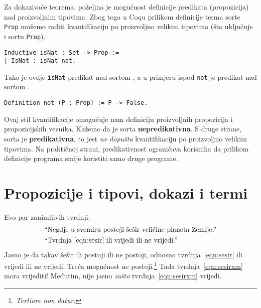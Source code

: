 Za dokazivače teorema, poželjna je mogućnost definicije predikata (propozicija) nad proizvoljnim tipovima.
Zbog toga u Coqu prilikom definicije terma sorte \texttt{Prop} možemo raditi kvantifikaciju po proizvoljno velikim tipovima
(što uključuje i sortu \texttt{Prop}).
\begin{verbatim}
Inductive isNat : Set -> Prop :=
| IsNat : isNat nat.
\end{verbatim}
\noindent Tako je ovdje \texttt{isNat} predikat nad sortom \coqset{}, a u primjeru ispod \texttt{not} je predikat nad sortom \coqprop{}.
\begin{verbatim}
Definition not (P : Prop) := P -> False.
\end{verbatim}
\noindent Ovaj stil kvantifikacije omogućuje nam definiciju proizvoljnih propozicija i propozicijskih veznika.
Kažemo da je sorta \coqprop{} \textbf{nepredikativna}.
S druge strane, sorta \coqset{} je \textbf{predikativna}, to jest \textit{ne dopušta} kvantifikaciju po proizvoljno velikim tipovima.
Na praktičnoj strani, predikativnost ograničava korisnika da prilikom definicije programa smije koristiti samo druge programe.


\section{Propozicije i tipovi, dokazi i termi}\label{sec:propozicije-i-tipovi}
Evo par zanimljivih tvrdnji:
\begin{align}
  & \textrm{``Negdje u svemiru postoji šešir veličine planeta Zemlje.''}\label{eqn:sesir}\\
  & \textrm{``Tvrdnja~\ref{eqn:sesir} ili vrijedi ili ne vrijedi.''}\label{eqn:sesirxm}
\end{align}
\noindent Jasno je da takav šešir ili postoji ili ne postoji, odnosno tvrdnja~\ref{eqn:sesir} ili vrijedi ili ne vrijedi.
Treća mogućnost ne postoji.\footnote{\textit{Tertium non datur.}}
Tada tvrdnja~\ref{eqn:sesirxm} mora vrijediti!
Međutim, nije jasno \textit{zašto} tvrdnja~\ref{eqn:sesirxm} vrijedi.

